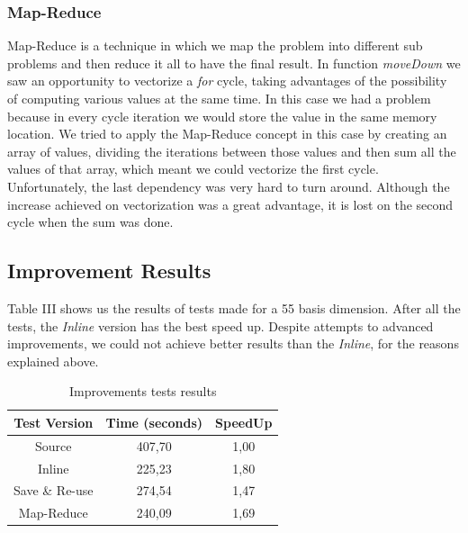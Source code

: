 \documentclass[conference]{IEEEtran}
\begin{document}
\subsubsection{Map-Reduce}
Map-Reduce is a technique in which we map the problem into different sub problems and then reduce it all to have the final result.
In function \emph{moveDown} we saw an opportunity to vectorize a \emph{for} cycle, taking advantages of the possibility of computing various values at the same time.
In this case we had a problem because in every cycle iteration we would store the value in the same memory location.
We tried to apply the Map-Reduce concept in this case by creating an array of values, dividing the iterations between those values and then sum all the values of that array, which meant we could vectorize the first cycle.
Unfortunately, the last dependency was very hard to turn around. Although the increase achieved on vectorization was a great advantage, it is lost on the second cycle when the sum was done.
    
\subsection{Improvement Results}
    Table III shows us the results of tests made for a 55 basis dimension. After all the tests, the \emph{Inline} version has the best speed up. Despite attempts to advanced improvements, we could not achieve better results than the \emph{Inline}, for the reasons explained above.
    
\begin{table}[ht!]
\centering
\label{my-label}

\begin{tabular}{|c|c|c|}
\hline
\rowcolor[HTML]{C0C0C0} 
{\color[HTML]{000000} Test Version} & {\color[HTML]{000000} Time (seconds)} & {\color[HTML]{000000} SpeedUp} \\ \hline
Source                          & 407,70            & 1,00          \\ \hline
Inline                          & 225,23            & 1,80          \\ \hline
Save \& Re-use                  & 274,54            & 1,47          \\ \hline
Map-Reduce                      & 240,09            & 1,69          \\ \hline
\end{tabular}
\caption{Improvements tests results}
\end{table}
    
\end{document}
